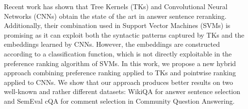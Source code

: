 Recent work has shown that Tree Kernels (TKs) and Convolutional Neural Networks (CNNs) obtain the state of the art in answer sentence reranking. Additionally, their combination used in Support Vector Machines (SVMs) is promising as it can exploit both the syntactic patterns captured by TKs and the embeddings learned by CNNs. However, the embeddings are constructed according to a classification function, which is not directly exploitable in the preference ranking algorithm of SVMs. In this work, we propose a new hybrid approach combining preference ranking applied to TKs and pointwise ranking applied to CNNs. We show that our approach produces better results on two well-known and rather different datasets: WikiQA for answer sentence selection and SemEval cQA for comment selection in Community Question Answering.
